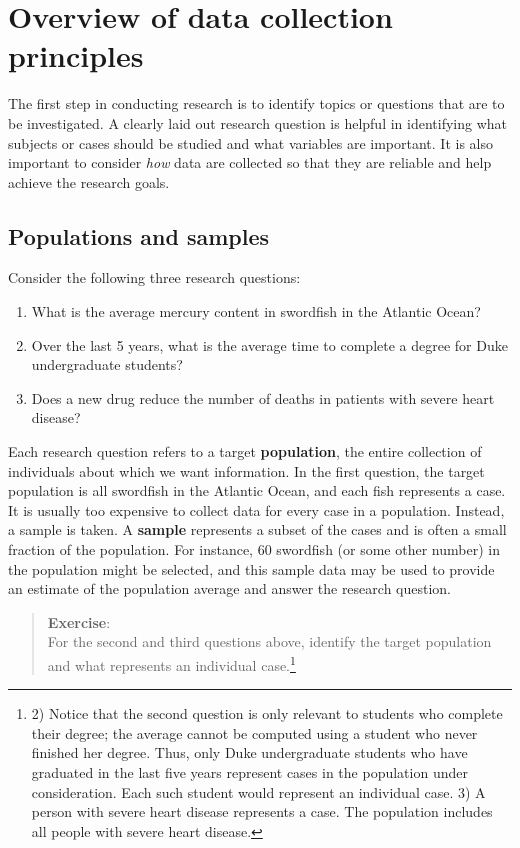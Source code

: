 \documentclass[
  letterpaper,
  DIV=11,
  numbers=noendperiod]{scrreprt}
\providecommand{\tightlist}{%
  \setlength{\itemsep}{0pt}\setlength{\parskip}{0pt}}\usepackage{longtable,booktabs,array}
\begin{document}
\section{Overview of data collection
principles}\label{overview-of-data-collection-principles-1}

The first step in conducting research is to identify topics or questions
that are to be investigated. A clearly laid out research question is
helpful in identifying what subjects or cases should be studied and what
variables are important. It is also important to consider \emph{how}
data are collected so that they are reliable and help achieve the
research goals.

\subsection{Populations and samples}\label{populations-and-samples}

Consider the following three research questions:

\begin{enumerate}
\def\labelenumi{\arabic{enumi}.}
\tightlist
\item
  What is the average mercury content in swordfish in the Atlantic
  Ocean?\\
\item
  Over the last 5 years, what is the average time to complete a degree
  for Duke undergraduate students?\\
\item
  Does a new drug reduce the number of deaths in patients with severe
  heart disease?
\end{enumerate}

Each research question refers to a target \textbf{population}, the
entire collection of individuals about which we want information. In the
first question, the target population is all swordfish in the Atlantic
Ocean, and each fish represents a case. It is usually too expensive to
collect data for every case in a population. Instead, a sample is taken.
A \textbf{sample} represents a subset of the cases and is often a small
fraction of the population. For instance, 60 swordfish (or some other
number) in the population might be selected, and this sample data may be
used to provide an estimate of the population average and answer the
research question.

\begin{quote}
\textbf{Exercise}:\\
For the second and third questions above, identify the target population
and what represents an individual case.\footnote{2) Notice that the
  second question is only relevant to students who complete their
  degree; the average cannot be computed using a student who never
  finished her degree. Thus, only Duke undergraduate students who have
  graduated in the last five years represent cases in the population
  under consideration. Each such student would represent an individual
  case. 3) A person with severe heart disease represents a case. The
  population includes all people with severe heart disease.}
\end{quote}
\end{document}
